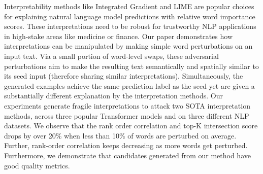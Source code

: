 Interpretability methods like Integrated Gradient and LIME are popular choices for explaining natural language model predictions with relative word importance scores. These interpretations need to be robust for trustworthy NLP applications in high-stake areas like medicine or finance. Our paper demonstrates how interpretations can be manipulated by making simple word perturbations on an input text. Via a small portion of word-level swaps, these adversarial perturbations aim to make the resulting text semantically and spatially similar to its seed input (therefore sharing similar interpretations). Simultaneously, the generated examples achieve the same prediction label as the seed yet are given a substantially different explanation by the interpretation methods. Our experiments generate fragile interpretations to attack two SOTA interpretation methods, across three popular Transformer models and on three different NLP datasets. We observe that the rank order correlation and top-K intersection score drops by over 20\% when less than 10\% of words are perturbed on average. Further, rank-order correlation keeps decreasing as more words get perturbed. Furthermore, we demonstrate that candidates generated from our method have good quality metrics.
